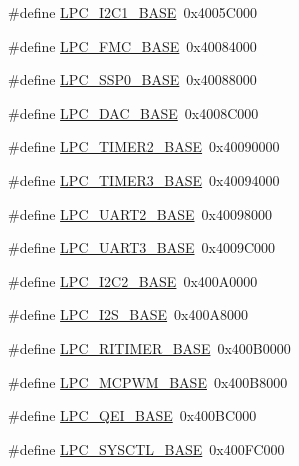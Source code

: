 \begin{DoxyCompactItemize}
\item 
\#define \hyperlink{group__PERIPH__175X__6X__BASE_gae59f73cf24ff126be3b9a8b921926676}{L\-P\-C\-\_\-\-I2\-C1\-\_\-\-B\-A\-S\-E}~0x4005\-C000
\item 
\#define \hyperlink{group__PERIPH__175X__6X__BASE_gaad6b7f57ab13bf5886da624bbb4bcc61}{L\-P\-C\-\_\-\-F\-M\-C\-\_\-\-B\-A\-S\-E}~0x40084000
\item 
\#define \hyperlink{group__PERIPH__175X__6X__BASE_ga53fb1af80b541545988f2a966681abfd}{L\-P\-C\-\_\-\-S\-S\-P0\-\_\-\-B\-A\-S\-E}~0x40088000
\item 
\#define \hyperlink{group__PERIPH__175X__6X__BASE_ga3bbaedad584252212d4704bb419489f6}{L\-P\-C\-\_\-\-D\-A\-C\-\_\-\-B\-A\-S\-E}~0x4008\-C000
\item 
\#define \hyperlink{group__PERIPH__175X__6X__BASE_gab46122134a159b494e060ae3a7be0967}{L\-P\-C\-\_\-\-T\-I\-M\-E\-R2\-\_\-\-B\-A\-S\-E}~0x40090000
\item 
\#define \hyperlink{group__PERIPH__175X__6X__BASE_ga002e95d51eef32473052ea2575440eac}{L\-P\-C\-\_\-\-T\-I\-M\-E\-R3\-\_\-\-B\-A\-S\-E}~0x40094000
\item 
\#define \hyperlink{group__PERIPH__175X__6X__BASE_ga8c3873ab74db743465b038c74b365281}{L\-P\-C\-\_\-\-U\-A\-R\-T2\-\_\-\-B\-A\-S\-E}~0x40098000
\item 
\#define \hyperlink{group__PERIPH__175X__6X__BASE_gac8dc517d5e03d4ca7666c18c89d5052e}{L\-P\-C\-\_\-\-U\-A\-R\-T3\-\_\-\-B\-A\-S\-E}~0x4009\-C000
\item 
\#define \hyperlink{group__PERIPH__175X__6X__BASE_ga00796bd1f1fa200bbffcd9e7e8679eaa}{L\-P\-C\-\_\-\-I2\-C2\-\_\-\-B\-A\-S\-E}~0x400\-A0000
\item 
\#define \hyperlink{group__PERIPH__175X__6X__BASE_gacff8b54e3924910d381e6b8ba804050c}{L\-P\-C\-\_\-\-I2\-S\-\_\-\-B\-A\-S\-E}~0x400\-A8000
\item 
\#define \hyperlink{group__PERIPH__175X__6X__BASE_ga37e5300b78c57ef9d338291e79610971}{L\-P\-C\-\_\-\-R\-I\-T\-I\-M\-E\-R\-\_\-\-B\-A\-S\-E}~0x400\-B0000
\item 
\#define \hyperlink{group__PERIPH__175X__6X__BASE_gad8a41dc802e3ea0ba9457d42a6927c03}{L\-P\-C\-\_\-\-M\-C\-P\-W\-M\-\_\-\-B\-A\-S\-E}~0x400\-B8000
\item 
\#define \hyperlink{group__PERIPH__175X__6X__BASE_ga80fa25b18324c10c8e5c26893e6f0a67}{L\-P\-C\-\_\-\-Q\-E\-I\-\_\-\-B\-A\-S\-E}~0x400\-B\-C000
\item 
\#define \hyperlink{group__PERIPH__175X__6X__BASE_gae4670b50fe27772fa31de1da10bec7b7}{L\-P\-C\-\_\-\-S\-Y\-S\-C\-T\-L\-\_\-\-B\-A\-S\-E}~0x400\-F\-C000

\end{DoxyCompactItemize}
